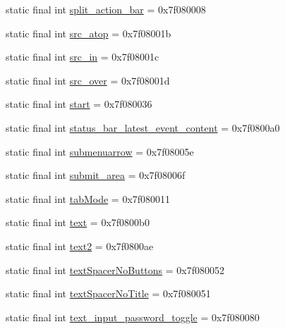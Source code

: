 \begin{CompactItemize}
\item 
static final int \hyperlink{classandroid_1_1support_1_1mediacompat_1_1_r_1_1id_e5a7f9562dace7ab2983dce0522e5fe4}{split\_\-action\_\-bar} = 0x7f080008
\item 
static final int \hyperlink{classandroid_1_1support_1_1mediacompat_1_1_r_1_1id_bbc471f575fab0de7d360dc5e1f87c41}{src\_\-atop} = 0x7f08001b
\item 
static final int \hyperlink{classandroid_1_1support_1_1mediacompat_1_1_r_1_1id_19af05c5b40c2dfd3809e6cf8018c1de}{src\_\-in} = 0x7f08001c
\item 
static final int \hyperlink{classandroid_1_1support_1_1mediacompat_1_1_r_1_1id_e125f907bcb335ea2f37e512823089ef}{src\_\-over} = 0x7f08001d
\item 
static final int \hyperlink{classandroid_1_1support_1_1mediacompat_1_1_r_1_1id_78fa55982322125fb6b42fd4ad1a2238}{start} = 0x7f080036
\item 
static final int \hyperlink{classandroid_1_1support_1_1mediacompat_1_1_r_1_1id_49428b41274e7150a8129bda146c3d52}{status\_\-bar\_\-latest\_\-event\_\-content} = 0x7f0800a0
\item 
static final int \hyperlink{classandroid_1_1support_1_1mediacompat_1_1_r_1_1id_14c652b96441ab3cc4ab539b17b69c07}{submenuarrow} = 0x7f08005e
\item 
static final int \hyperlink{classandroid_1_1support_1_1mediacompat_1_1_r_1_1id_972bf7b7bb5fd72fecb1f5e74ca47ed6}{submit\_\-area} = 0x7f08006f
\item 
static final int \hyperlink{classandroid_1_1support_1_1mediacompat_1_1_r_1_1id_c637a81985682b929d2b821201615274}{tabMode} = 0x7f080011
\item 
static final int \hyperlink{classandroid_1_1support_1_1mediacompat_1_1_r_1_1id_3eb9668f54249287cbbeea002f591d5b}{text} = 0x7f0800b0
\item 
static final int \hyperlink{classandroid_1_1support_1_1mediacompat_1_1_r_1_1id_84361faa6513991dc45ed777b9cbe529}{text2} = 0x7f0800ae
\item 
static final int \hyperlink{classandroid_1_1support_1_1mediacompat_1_1_r_1_1id_2412beffa50cd1b30db94edbb470a62c}{textSpacerNoButtons} = 0x7f080052
\item 
static final int \hyperlink{classandroid_1_1support_1_1mediacompat_1_1_r_1_1id_8df9d3930493dac232f7c7dff48a3947}{textSpacerNoTitle} = 0x7f080051
\item 
static final int \hyperlink{classandroid_1_1support_1_1mediacompat_1_1_r_1_1id_8e53ac8853b5817c84828188edfab8e7}{text\_\-input\_\-password\_\-toggle} = 0x7f080080

\end{CompactItemize}
